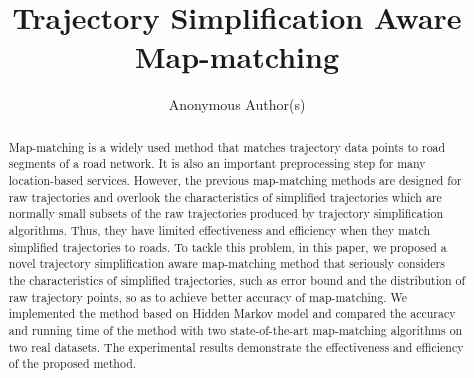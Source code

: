 \documentclass[sigconf, review]{acmart}
\begin{document}
\title{Trajectory Simplification Aware Map-matching}



\author{Anonymous Author(s)}





\renewcommand{\shortauthors}{XXX et al.}


\begin{abstract}
Map-matching is a {widely} used method that matches trajectory
data points to road segments of a road network. It is also an important
preprocessing step for many location-based services. However, the previous
map-matching methods are designed for raw trajectories and overlook the
{characteristics} of simplified trajectories which are normally small subsets of the raw trajectories produced by trajectory simplification algorithms. Thus, they have limited effectiveness and efficiency when they match simplified trajectories to roads.
To tackle this problem, in this paper, we proposed a novel trajectory
simplification aware map-matching method that seriously considers the
{characteristics} of simplified trajectories, such as error bound and the distribution of raw trajectory points, so as to achieve better accuracy of map-matching.
We implemented the method based on Hidden Markov model and compared the accuracy and running time of the method with two state-of-the-art map-matching algorithms on two real datasets. The experimental results demonstrate the effectiveness and efficiency of the proposed method.
\end{abstract}
\end{document}
